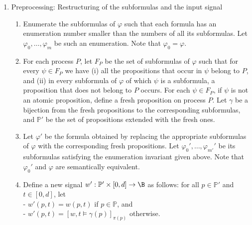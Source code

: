 \begin{enumerate}
	\item Preprocessing: Restructuring of the subformulas and the input signal
	\begin{enumerate}[label=\arabic*.]
		\item Enumerate the subformulas of $\varphi$ such that each formula has an enumeration number smaller than the numbers of all its subformulas. Let $\varphi_0, \ldots, \varphi_m$ be such an enumeration. Note that $\varphi_0 = \varphi$.
		\item For each process $P$, let $F_P$ be the set of subformulas of $\varphi$ such that for every  $\psi \in F_P$ we have (i) all the propositions that occur in $\psi$ belong to $P$, and (ii) in every subformula of $\varphi$ of which $\psi$ is a subformula, a proposition that does not belong to $P$ occurs. For each $\psi \in F_P$, if $\psi$ is not an atomic proposition, define a fresh proposition on process $P$. Let $\gamma$ be a bijection from the fresh propositions to the corresponding subformulas, and $\mathbb{P}'$ be the set of propositions extended with the fresh ones.
		\item Let $\varphi'$ be the formula obtained by replacing the appropriate subformulas of $\varphi$ with the corresponding fresh propositions. Let $\varphi_0', \ldots, \varphi_{m'}'$ be its subformulas satisfying the enumeration invariant given above. Note that $\varphi_0'$  and $\varphi$ are semantically equivalent. %
		\item Define a new signal $w' : \mathbb{P}' \times [0,d] \to \B$ as follows: for all $p \in \mathbb{P}'$ and $t \in [0,d]$, let \\
		- $w'(p,t) = w(p,t)$ if $p \in \mathbb{P}$, and\\
		- $w'(p,t) = [w,t \models \gamma(p)]_{\pi(p)}$ otherwise.
	\end{enumerate}
	

\end{enumerate}
